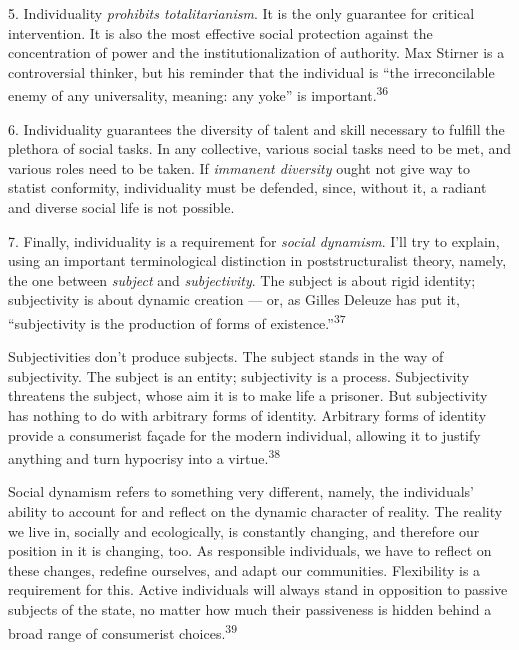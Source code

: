 5. Individuality \textit{prohibits totalitarianism}. It is the only guarantee
for critical intervention. It is also the most effective social protection
against the concentration of power and the institutionalization of authority.
Max Stirner is a controversial thinker, but his reminder that the individual is
“the irreconcilable enemy of any universality, meaning: any yoke” is
important.\textsuperscript{36}

6. Individuality guarantees the diversity of talent and skill necessary to
fulfill the plethora of social tasks. In any collective, various social tasks
need to be met, and various roles need to be taken. If \textit{immanent
diversity} ought not give way to statist conformity, individuality must be
defended, since, without it, a radiant and diverse social life is not possible.

7. Finally, individuality is a requirement for \textit{social dynamism}. I’ll
try to explain, using an important terminological distinction in
poststructuralist theory, namely, the one between \textit{subject} and
\textit{subjectivity}. The subject is about rigid identity; subjectivity is
about dynamic creation — or, as Gilles Deleuze has put it, “subjectivity is the
production of forms of existence.”\textsuperscript{37}

Subjectivities don’t produce subjects. The subject stands in the way of
subjectivity. The subject is an entity; subjectivity is a process. Subjectivity
threatens the subject, whose aim it is to make life a prisoner. But subjectivity
has nothing to do with arbitrary forms of identity. Arbitrary forms of identity
provide a consumerist façade for the modern individual, allowing it to justify
anything and turn hypocrisy into a virtue.\textsuperscript{38}

Social dynamism refers to something very different, namely, the individuals’
ability to account for and reflect on the dynamic character of reality. The
reality we live in, socially and ecologically, is constantly changing, and
therefore our position in it is changing, too. As responsible individuals, we
have to reflect on these changes, redefine ourselves, and adapt our communities.
Flexibility is a requirement for this. Active individuals will always stand in
opposition to passive subjects of the state, no matter how much their
passiveness is hidden behind a broad range of consumerist
choices.\textsuperscript{39}

